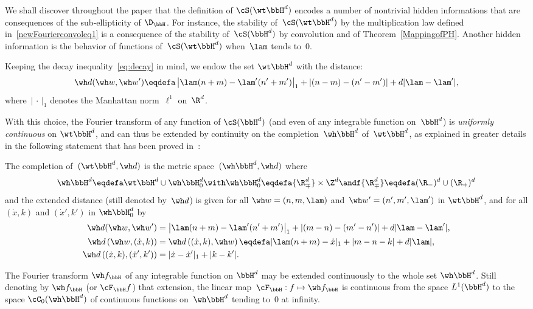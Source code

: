 We shall discover throughout the paper that the definition of $\cS(\wt\bbH^d)$ encodes a number of nontrivial hidden informations that are consequences of the sub-ellipticity of $\D_\bbH$. For instance, the stability of~$\cS(\wt \bbH^d)$ by the multiplication law defined in~\eqref{newFourierconvoleq1} is a consequence of the stability of~$\cS(\bbH^d)$ by convolution and of Theorem~\ref{MappingofPH}. Another hidden information is the behavior of functions of~$\cS(\wt \bbH^d)$ when~$\lam$ tends to~$0$.

Keeping the decay inequality~\eqref{eq:decay} in mind, we endow the set $\wt\bbH^d$ with the distance:
\[
\wh d(\wh w,\wh w') \eqdefa \left|\lam(n+m)-\lam'(n'+m')\right|_1 +|(n-m)-(n'-m')|+d|\lam-\lam'|,
\]
where~$|{\,\cdot\,}|_1$ denotes the Manhattan norm~$\ell^1$ on~$\R^d$.

With this choice, the Fourier transform of any function of $\cS(\bbH^d)$ (and even of any integrable function on~$\bbH^d$) is \emph{uniformly continuous} on $\wt\bbH^d$, and can thus be extended by continuity on the completion~$\wh\bbH^d$ of~$\wt\bbH^d$, as explained in greater details in the following statement that has been proved in~\cite {bcdFHspace}:

\begin{theo}\label{FourierL1basicbis}
The completion of~$(\wt \bbH^d, \wh d)$ is the metric space~$(\wh \bbH^d,\wh d)$ where
\[
\wh \bbH^d\eqdefa \wt\bbH^d \cup \wh \bbH^d_0 \with \wh \bbH^d_0 \eqdefa {\R_{\mp}^d}\times \Z^d
\andf {\R_{\mp}^d}\eqdefa (\R_-)^d\cup (\R_+)^d
\]
and the extended distance (still denoted by~$\wh d$) is given for all $\wh w=(n,m,\lam)$ and~$\wh w'=(n',m',\lam')$ in $\wt\bbH^d$, and for all $(\dot x,k)$ and $(\dot x',k')$ in $\wh\bbH_0^d$ by
\begin{align*}
\wh d(\wh w,\wh w') &= \left|\lam(n+m)-\lam'(n'+m')\right|_1 +|(m-n)-(m'-n')|+d|\lam-\lam'|,\\
\wh d\left (\wh w, (\dot x, k)\right) &= \wh d\left ((\dot x, k), \wh w \right) \eqdefa |\lam(n+m)-\dot x|_1+ |m-n-k|+d|\lam|, \\
\wh d\left ((\dot x,k), (\dot x', k')\right) &= |\dot x-\dot x'|_1+|k-k'|.
\end{align*}

The Fourier transform $\wh f_\bbH$ of any integrable function on $\bbH^d$ may be extended continuously to the whole set $\wh\bbH^d$. Still denoting by $\wh f_\bbH$ (or $\cF_\bbH f$) that extension, the linear map~$\cF_\bbH: f\mapsto \wh f_\bbH$ is continuous from the space $L^1(\bbH^d)$ to the space $\cC_0(\wh\bbH^d)$ of continuous functions on~$\wh \bbH^d$ tending to~$0$ at infinity.
\end{theo}


